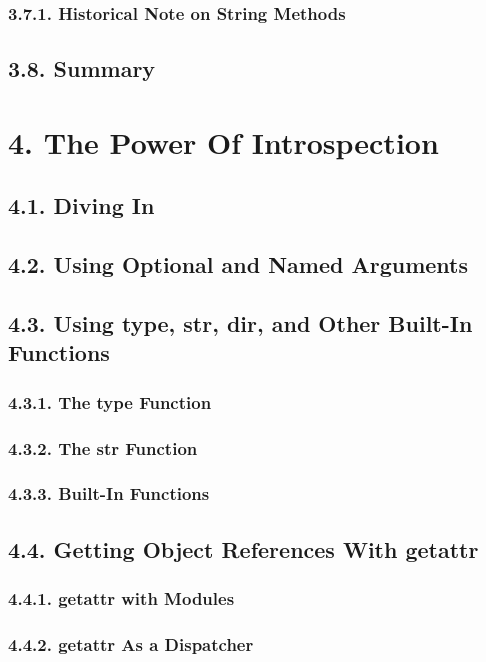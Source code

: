 \documentclass[oneside,12pt]{book}
\begin{document}
\subsection{3.7.1. Historical Note on String Methods}
       
\section{3.8. Summary}
   
\chapter{4. The Power Of Introspection}
\section{4.1. Diving In}
\section{4.2. Using Optional and Named Arguments}
\section{4.3. Using type, str, dir, and Other Built-In Functions}
\subsection{4.3.1. The type Function}
\subsection{4.3.2. The str Function}
\subsection{4.3.3. Built-In Functions}
       
\section{4.4. Getting Object References With getattr}
\subsection{4.4.1. getattr with Modules}
\subsection{4.4.2. getattr As a Dispatcher}
       
\end{document}
